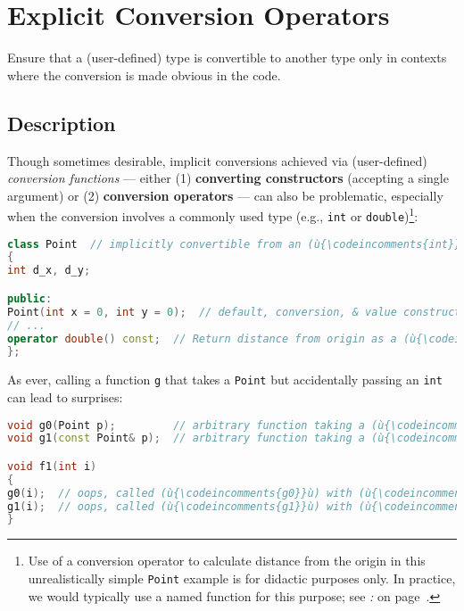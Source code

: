 \newpage
\section[{\tt explicit} Operators]{Explicit Conversion Operators}\label{explicit-conversion-operators}


Ensure that a (user-defined) type is convertible to another type only in
contexts where the conversion is made obvious in the code.

\subsection[Description]{Description}\label{description-explicitconv}

Though sometimes desirable, implicit conversions achieved via (user-defined) \emph{conversion
functions} --- either (1) \textbf{converting constructors} (accepting a
single argument) or (2) \textbf{conversion operators} --- can also be problematic, especially when the
conversion involves a commonly used type (e.g., \texttt{int} or
\texttt{double}){\cprotect\footnote{Use of a conversion operator to
calculate distance from the origin in this unrealistically simple \texttt{Point}
example is for didactic purposes only. In practice, we would typically
use a named function for this purpose; see {\it{}: } on page~\pageref{sometimes-a-named-function-is-better}.}}:

\begin{lstlisting}[language=C++]
class Point  // implicitly convertible from an (ù{\codeincomments{int}}ù) or to a (ù{\codeincomments{double}}ù)
{
int d_x, d_y;

public:
Point(int x = 0, int y = 0);  // default, conversion, & value constructor
// ...
operator double() const;  // Return distance from origin as a (ù{\codeincomments{double}}ù).
};
\end{lstlisting}

\noindent As ever, calling a function \texttt{g} that takes a \texttt{Point} but
accidentally passing an \texttt{int} can lead to surprises:

\begin{lstlisting}[language=C++]
void g0(Point p);         // arbitrary function taking a (ù{\codeincomments{Point}}ù) object by value
void g1(const Point& p);  // arbitrary function taking a (ù{\codeincomments{Point}}ù) by (ù{\codeincomments{const}}ù) reference

void f1(int i)
{
g0(i);  // oops, called (ù{\codeincomments{g0}}ù) with (ù{\codeincomments{Point(i, 0)}}ù) by mistake
g1(i);  // oops, called (ù{\codeincomments{g1}}ù) with (ù{\codeincomments{Point(i, 0)}}ù) by mistake
}
\end{lstlisting}

